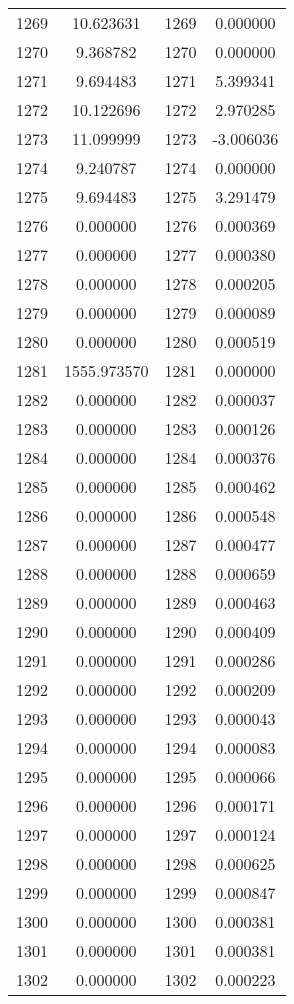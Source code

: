 \documentclass[12pt]{article}
\begin{document}
\begin{longtable}{@{}cccc@{}}
1269 & 10.623631 & 1269 & 0.000000 \\
1270 & 9.368782 & 1270 & 0.000000 \\
1271 & 9.694483 & 1271 & 5.399341 \\
1272 & 10.122696 & 1272 & 2.970285 \\
1273 & 11.099999 & 1273 & -3.006036 \\
1274 & 9.240787 & 1274 & 0.000000 \\
1275 & 9.694483 & 1275 & 3.291479 \\
1276 & 0.000000 & 1276 & 0.000369 \\
1277 & 0.000000 & 1277 & 0.000380 \\
1278 & 0.000000 & 1278 & 0.000205 \\
1279 & 0.000000 & 1279 & 0.000089 \\
1280 & 0.000000 & 1280 & 0.000519 \\
1281 & 1555.973570 & 1281 & 0.000000 \\
1282 & 0.000000 & 1282 & 0.000037 \\
1283 & 0.000000 & 1283 & 0.000126 \\
1284 & 0.000000 & 1284 & 0.000376 \\
1285 & 0.000000 & 1285 & 0.000462 \\
1286 & 0.000000 & 1286 & 0.000548 \\
1287 & 0.000000 & 1287 & 0.000477 \\
1288 & 0.000000 & 1288 & 0.000659 \\
1289 & 0.000000 & 1289 & 0.000463 \\
1290 & 0.000000 & 1290 & 0.000409 \\
1291 & 0.000000 & 1291 & 0.000286 \\
1292 & 0.000000 & 1292 & 0.000209 \\
1293 & 0.000000 & 1293 & 0.000043 \\
1294 & 0.000000 & 1294 & 0.000083 \\
1295 & 0.000000 & 1295 & 0.000066 \\
1296 & 0.000000 & 1296 & 0.000171 \\
1297 & 0.000000 & 1297 & 0.000124 \\
1298 & 0.000000 & 1298 & 0.000625 \\
1299 & 0.000000 & 1299 & 0.000847 \\
1300 & 0.000000 & 1300 & 0.000381 \\
1301 & 0.000000 & 1301 & 0.000381 \\
1302 & 0.000000 & 1302 & 0.000223 \\

\end{longtable}
\end{document}
